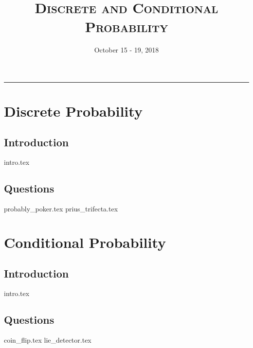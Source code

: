 \documentclass{exam}
\title{\textsc{Discrete and Conditional Probability}}
\date{October 15 - 19, 2018}
\begin{document}
\maketitle
\rule{\textwidth}{0.15em}
\fontsize{12}{15}\selectfont
\thispagestyle{empty}

\section{Discrete Probability}
\subsection{Introduction}
{intro.tex}
\subsection{Questions}
\begin{questions}
{probably_poker.tex}
{prius_trifecta.tex}
\end{questions}


\section{Conditional Probability}
\subsection{Introduction}
{intro.tex}
\subsection{Questions}
\begin{questions}
{coin_flip.tex}
{lie_detector.tex}
\end{questions}
\end{document}
